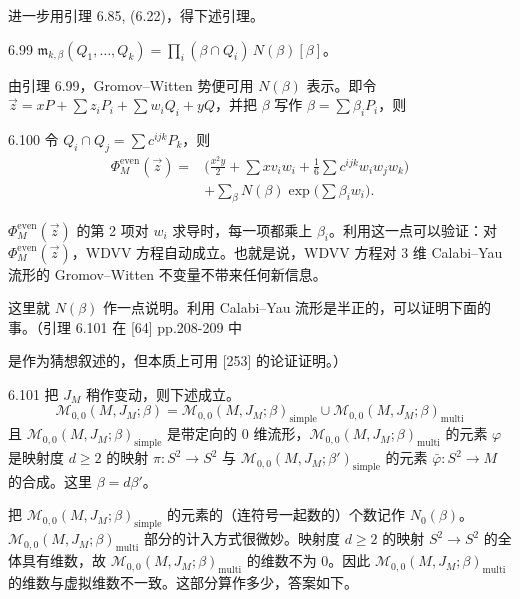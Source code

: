 进一步用引理 6.85, (6.22)，得下述引理。

\begin{lemma}{6.99}
  $\mathfrak{m}_{k,\beta}(Q_1,\dots,Q_k)=\prod_i(\beta\cap Q_i)\,N(\beta)[\beta]$。
\end{lemma}

由引理 6.99，Gromov–Witten 势便可用 $N(\beta)$ 表示。即令 $\vec z=xP+\sum z_iP_i+\sum w_iQ_i+yQ$，并把 $\beta$ 写作 $\beta=\sum\beta_iP_i$，则

\begin{lemma}{6.100}
  令 $Q_i\cap Q_j=\sum c^{ijk}P_k$，则
  \[
  \begin{aligned}
    \Phi_M^{\mathrm{even}}(\vec z)
    ={}&\Big(\frac{x^2y}{2}+\sum xv_iw_i+\frac16\sum c^{ijk}w_iw_jw_k\Big)\\
    &+\sum_\beta N(\beta)\exp\Big(\sum\beta_iw_i\Big).
  \end{aligned}
  \]
\end{lemma}

$\Phi_M^{\mathrm{even}}(\vec z)$ 的第 2 项对 $w_i$ 求导时，每一项都乘上 $\beta_i$。利用这一点可以验证：对 $\Phi_M^{\mathrm{even}}(\vec z)$，WDVV 方程自动成立。也就是说，WDVV 方程对 $3$ 维 Calabi–Yau 流形的 Gromov–Witten 不变量不带来任何新信息。


这里就 $N(\beta)$ 作一点说明。利用 Calabi–Yau 流形是半正的，可以证明下面的事。（引理 6.101 在 [64] pp.208-209 中

是作为猜想叙述的，但本质上可用 [253] 的论证证明。）

\begin{lemma}{6.101}
  把 $J_M$ 稍作变动，则下述成立。
  \[
    \mathcal{M}_{0,0}(M,J_M;\beta)
    =\mathcal{M}_{0,0}(M,J_M;\beta)_{\mathrm{simple}}
    \cup\mathcal{M}_{0,0}(M,J_M;\beta)_{\mathrm{multi}}
  \]
  且 $\mathcal{M}_{0,0}(M,J_M;\beta)_{\mathrm{simple}}$ 是带定向的 $0$ 维流形，$\mathcal{M}_{0,0}(M,J_M;\beta)_{\mathrm{multi}}$ 的元素 $\varphi$ 是映射度 $d\ge2$ 的映射 $\pi\colon S^2\to S^2$ 与 $\mathcal{M}_{0,0}(M,J_M;\beta')_{\mathrm{simple}}$ 的元素 $\bar\varphi\colon S^2\to M$ 的合成。这里 $\beta=d\beta'$。
\end{lemma}

把 $\mathcal{M}_{0,0}(M,J_M;\beta)_{\mathrm{simple}}$ 的元素的（连符号一起数的）个数记作 $N_0(\beta)$。$\mathcal{M}_{0,0}(M,J_M;\beta)_{\mathrm{multi}}$ 部分的计入方式很微妙。映射度 $d\ge2$ 的映射 $S^2\to S^2$ 的全体具有维数，故 $\mathcal{M}_{0,0}(M,J_M;\beta)_{\mathrm{multi}}$ 的维数不为 $0$。因此 $\mathcal{M}_{0,0}(M,J_M;\beta)_{\mathrm{multi}}$ 的维数与虚拟维数不一致。这部分算作多少，答案如下。


